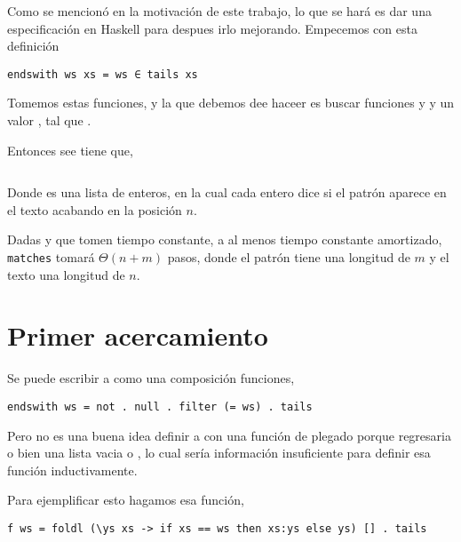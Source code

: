 
Como se mencionó en la motivación de este trabajo, lo que se hará es dar una especificación en Haskell para
despues irlo mejorando. Empecemos con esta definición

\begin{verbatim}
endswith ws xs = ws ∈ tails xs
\end{verbatim}



Tomemos estas funciones, y la que debemos dee haceer es buscar funciones  y  y un valor ,
tal que .

Entonces see tiene que,

\inputminted{haskell}{definiciones/kmp/1-matches.hs}

Donde  es una lista de enteros, en la cual cada entero  dice si el patrón  aparece en el texto
 acabando en la posición $n$.


Dadas  y  que tomen tiempo constante, a al menos tiempo constante amortizado, \texttt{matches} tomará $\Theta(n + m)$ pasos, donde
el patrón tiene una longitud de $m$ y el texto una longitud de $n$.


\section{Primer acercamiento}

Se puede escribir a  como una composición funciones,

\begin{verbatim}
endswith ws = not . null . filter (= ws) . tails
\end{verbatim}

Pero no es una buena idea definir a  con una función de plegado 
porque regresaria o bien una lista vacia o \hsCode{[ws]}, lo cual sería información insuficiente
para definir esa función inductivamente.

Para ejemplificar esto hagamos esa función,
\begin{verbatim}
f ws = foldl (\ys xs -> if xs == ws then xs:ys else ys) [] . tails
\end{verbatim}

